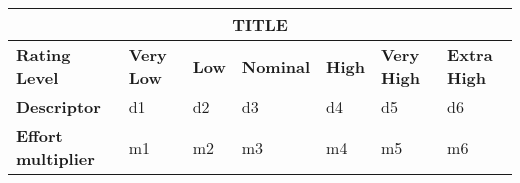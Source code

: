 \hspace*{-3cm}\begin{tabular}{|p{3cm}|p{2cm}|p{2cm}|p{2cm}|p{2cm}|p{2cm}|p{2cm}|}
\hline
\multicolumn{7}{|c|}{\textbf{TITLE}}\\
\hline
\hline
\textbf{Rating Level} & \textbf{Very Low} & \textbf{Low} & \textbf{Nominal} & \textbf{High} & \textbf{Very High} & \textbf{Extra High}\\
\hline
\textbf{Descriptor} & d1 & d2 & d3 & d4 & d5 & d6\\
\hline
\textbf{Effort multiplier} & m1 & m2 & m3 & m4 & m5 & m6\\
\hline 
\end{tabular}